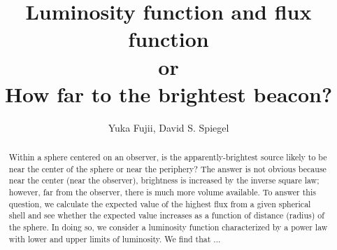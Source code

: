 \documentclass[iop,numberedappendix,apj,twocolappendix,]{emulateapj}
\begin{document}
\renewcommand\bottomfraction{.9}
\newcommand{\PD}[2]{\frac{\partial {#1}}{\partial {#2}}}
\newcommand{\memoYF}[1]{\color{red} #1 \color{black}}

\title{Luminosity function and flux function\\
or\\
How far to the brightest beacon?}
\author{%
Yuka Fujii, %
David S. Spiegel%
}


  



\begin{abstract}
Within a sphere centered on an observer, is the apparently-brightest source likely to be near the center of the sphere or near the periphery?
The answer is not obvious because near the center (near the observer), brightness is increased by the inverse square law; however, far from the observer, there is much more volume available.
%
To answer this question, we calculate the expected value of the highest flux from a given spherical shell and see whether the expected value increases as a function of distance (radius) of the sphere. 
In doing so, we consider  a luminosity function characterized by a power law with lower and upper limits of luminosity.
We find that \memoYF{...}
\end{abstract} 
\end{document}
